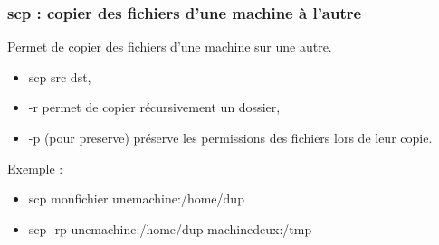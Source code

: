 \documentclass[handout,10pt]{beamer}
\begin{document}
\frame
{
    \frametitle{scp : copier des fichiers d'une machine à l'autre}

    Permet de copier des fichiers d'une machine sur une autre.

    \begin{itemize}
        \item {\ttfamily scp src dst},
        \item {\ttfamily -r} permet de copier récursivement un dossier,
        \item {\ttfamily -p} (pour preserve) préserve les permissions des fichiers lors de leur copie.
    \end{itemize}

    Exemple :
    \begin{itemize}
        \item {\ttfamily scp monfichier unemachine\string:/home/dup}
        \item {\ttfamily scp -rp unemachine\string:/home/dup machinedeux\string:/tmp}
    \end{itemize}
}







\end{document}
